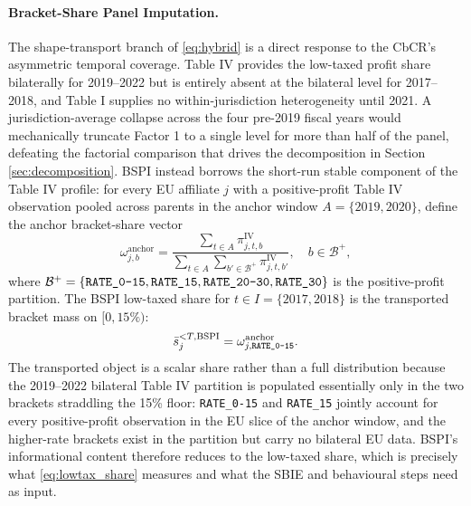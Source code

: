 \documentclass[11pt,a4paper]{article}
\newcommand{\code}[1]{\texttt{#1}}
\begin{document}
\paragraph{Bracket-Share Panel Imputation.}\label{sec:bspi}
The shape-transport branch of \eqref{eq:hybrid} is a direct response to the CbCR's asymmetric temporal coverage. Table IV provides the low-taxed profit share bilaterally for 2019--2022 but is entirely absent at the bilateral level for 2017--2018, and Table I supplies no within-jurisdiction heterogeneity until 2021. A jurisdiction-average collapse across the four pre-2019 fiscal years would mechanically truncate Factor 1 to a single level for more than half of the panel, defeating the factorial comparison that drives the decomposition in Section \ref{sec:decomposition}. BSPI instead borrows the short-run stable component of the Table IV profile: for every EU affiliate $j$ with a positive-profit Table IV observation pooled across parents in the anchor window $A = \{2019, 2020\}$, define the anchor bracket-share vector
\begin{equation}\label{eq:bspi_anchor}
\omega_{j,b}^{\text{anchor}} = \frac{\sum_{t \in A}\pi_{j,t,b}^{\text{IV}}}{\sum_{t \in A}\sum_{b' \in \mathcal{B}^{+}}\pi_{j,t,b'}^{\text{IV}}}, \quad b \in \mathcal{B}^{+},
\end{equation}
where $\mathcal{B}^{+} = \{\code{RATE\_0\text{-}15},\code{RATE\_15},\code{RATE\_20\text{-}30},\code{RATE\_30}\}$ is the positive-profit partition. The BSPI low-taxed share for $t \in I = \{2017, 2018\}$ is the transported bracket mass on $[0, 15\%)$:
\begin{equation}\label{eq:bspi}
\bar{s}_{j}^{<T,\text{BSPI}} = \omega_{j,\code{RATE\_0\text{-}15}}^{\text{anchor}}.
\end{equation}
The transported object is a scalar share rather than a full distribution because the 2019--2022 bilateral Table IV partition is populated essentially only in the two brackets straddling the 15\% floor: \code{RATE\_0-15} and \code{RATE\_15} jointly account for every positive-profit observation in the EU slice of the anchor window, and the higher-rate brackets exist in the partition but carry no bilateral EU data. BSPI's informational content therefore reduces to the low-taxed share, which is precisely what \eqref{eq:lowtax_share} measures and what the SBIE and behavioural steps need as input.
\end{document}
